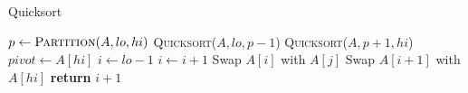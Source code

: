 \documentclass{article}
\begin{document}
\begin{algorithm}
\caption{Quicksort}
\begin{algorithmic}[1]
        \State $p \gets \textsc{Partition}(A, lo, hi)$
        \State \textsc{Quicksort}($A, lo, p-1$)
        \State \textsc{Quicksort}($A, p+1, hi$)
    \EndIf
\EndProcedure
\Statex
{}
    \State $pivot \gets A[hi]$
    \State $i \gets lo - 1$
            \State $i \gets i + 1$
            \State Swap $A[i]$ with $A[j]$
        \EndIf
    \EndFor
    \State Swap $A[i+1]$ with $A[hi]$
    \State \textbf{return} $i+1$
\EndProcedure
\end{algorithmic}
\end{algorithm}
\end{document}
